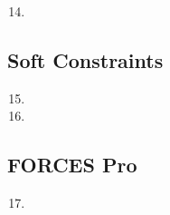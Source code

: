 \documentclass[11pt]{article}
\begin{document}
\begin{enumerate}
    \setcounter{enumi}{13}
    \item
\end{enumerate}



\subsection*{Soft Constraints} %
\label{sub:soft_constraints}

\begin{enumerate}
    \setcounter{enumi}{14}
    \item

    \item

\end{enumerate}



\subsection*{FORCES Pro} %
\label{sub:forces_pro}

\begin{enumerate}
    \setcounter{enumi}{16}
    \item
\end{enumerate}

\end{document}
